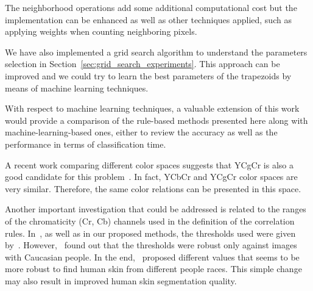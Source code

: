 The neighborhood operations add some additional computational cost but the implementation can be enhanced as well as other techniques applied, such as applying weights when counting neighboring pixels.

We have also implemented a grid search algorithm to understand the parameters selection in Section~\ref{sec:grid_search_experiments}. This approach can be improved and we could try to learn the best parameters of the trapezoids by means of machine learning techniques.

With respect to machine learning techniques, a valuable extension of this work would provide a comparison of the rule-based methods presented here along with machine-learning-based ones, either to review the accuracy as well as the performance in terms of classification time. 

A recent work comparing different color spaces suggests that YCgCr is also a good candidate for this problem~\citep{chaves:10}. In fact, YCbCr and YCgCr color spaces are very similar. Therefore, the same color relations can be presented in this space.

Another important investigation that could be addressed is related to the ranges of the chromaticity (Cr, Cb) channels used in the definition of the correlation rules. In~\citet{brancati:17}, as well as in our proposed methods, the thresholds used were given by~\citet{chai:99}. However,~\citet{basilio:11} found out that the thresholds were robust only against images with Caucasian people. In the end,~\citet{basilio:11} proposed different values that seems to be more robust to find human skin from different people races. This simple change may also result in improved human skin segmentation quality.